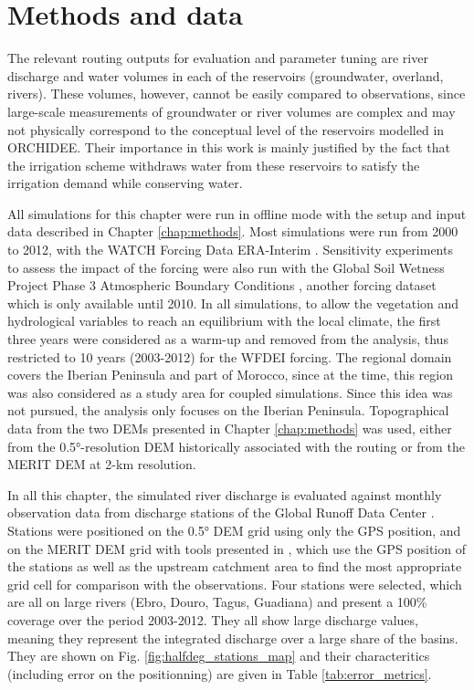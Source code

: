 \section{Methods and data}

The relevant routing outputs for evaluation and parameter tuning are river discharge and water volumes in each of the reservoirs (groundwater, overland, rivers). 
These volumes, however, cannot be easily compared to observations, since large-scale measurements of groundwater or river volumes are complex and may not physically correspond to the conceptual level of the reservoirs modelled in ORCHIDEE.
Their importance in this work is mainly justified by the fact that the irrigation scheme withdraws water from these reservoirs to satisfy the irrigation demand while conserving water.

All simulations for this chapter were run in offline mode with the setup and input data described in Chapter \ref{chap:methods}.
Most simulations were run from 2000 to 2012, with the WATCH Forcing Data ERA-Interim \citep[WFDEI, ][]{weedon_wfdei_2014}. Sensitivity experiments to assess the impact of the forcing were also run with the Global Soil Wetness Project Phase 3 Atmospheric Boundary Conditions \citep[GSWP3, ][]{kim_hyungjun_global_2017}, another forcing dataset which is only available until 2010.
In all simulations, to allow the vegetation and hydrological variables to reach an equilibrium with the local climate, the first three years were considered as a warm-up and removed from the analysis, thus restricted to 10 years (2003-2012) for the WFDEI forcing. The regional domain covers the Iberian Peninsula and part of Morocco, since at the time, this region was also considered as a study area for coupled simulations. Since this idea was not pursued, the analysis only focuses on the Iberian Peninsula.
Topographical data from the two DEMs presented in Chapter \ref{chap:methods} was used, either from the 0.5°-resolution DEM historically associated with the \std routing or from the MERIT DEM at 2-km resolution.

In all this chapter, the simulated river discharge is evaluated against monthly observation data from discharge stations of the Global Runoff Data Center \citep[GRDC, https://grdc.bafg.de,][]{fekete_global_2003}.
Stations were positioned on the 0.5° DEM grid using only the GPS position, and on the MERIT DEM grid with tools presented in \cite{polcher_hydrological_2023}, which use the GPS position of the stations as well as the upstream catchment area to find the most appropriate grid cell for comparison with the observations. 
Four stations were selected, which are all on large rivers (Ebro, Douro, Tagus, Guadiana) and present a 100\% coverage over the period 2003-2012. They all show large discharge values, meaning they represent the integrated discharge over a large share of the basins. They are shown on Fig. \ref{fig:halfdeg_stations_map} and their characteritics (including error on the positionning) are given in Table \ref{tab:error_metrics}.

